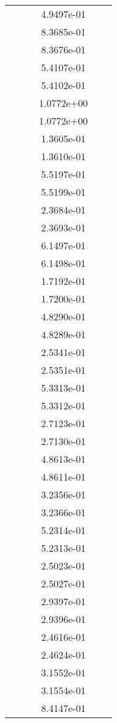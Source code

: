 \begin{xltabular}{\textwidth}{r|rS[table-format=1.3e+2]S[table-format=1.4e+2]S[table-format=1.4e+2]S[table-format=-1.5]}
&  &  & 4.9497e-01 & & \\
&  &  & 8.3685e-01 & & \\
&  &  & 8.3676e-01 & & \\
&  &  & 5.4107e-01 & & \\
&  &  & 5.4102e-01 & & \\
&  &  & 1.0772e+00 & & \\
&  &  & 1.0772e+00 & & \\
&  &  & 1.3605e-01 & & \\
&  &  & 1.3610e-01 & & \\
&  &  & 5.5197e-01 & & \\
&  &  & 5.5199e-01 & & \\
&  &  & 2.3684e-01 & & \\
&  &  & 2.3693e-01 & & \\
&  &  & 6.1497e-01 & & \\
&  &  & 6.1498e-01 & & \\
&  &  & 1.7192e-01 & & \\
&  &  & 1.7200e-01 & & \\
&  &  & 4.8290e-01 & & \\
&  &  & 4.8289e-01 & & \\
&  &  & 2.5341e-01 & & \\
&  &  & 2.5351e-01 & & \\
&  &  & 5.3313e-01 & & \\
&  &  & 5.3312e-01 & & \\
&  &  & 2.7123e-01 & & \\
&  &  & 2.7130e-01 & & \\
&  &  & 4.8613e-01 & & \\
&  &  & 4.8611e-01 & & \\
&  &  & 3.2356e-01 & & \\
&  &  & 3.2366e-01 & & \\
&  &  & 5.2314e-01 & & \\
&  &  & 5.2313e-01 & & \\
&  &  & 2.5023e-01 & & \\
&  &  & 2.5027e-01 & & \\
&  &  & 2.9397e-01 & & \\
&  &  & 2.9396e-01 & & \\
&  &  & 2.4616e-01 & & \\
&  &  & 2.4624e-01 & & \\
&  &  & 3.1552e-01 & & \\
&  &  & 3.1554e-01 & & \\
&  &  & 8.4147e-01 & & \\

\end{xltabular}
